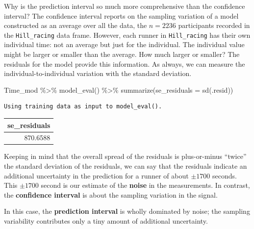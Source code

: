 \documentclass[
  letterpaper,
  DIV=11,
  numbers=noendperiod,
  oneside]{scrreprt}
\newenvironment{Shaded}{\begin{snugshade}}{\end{snugshade}}
\newcommand{\AttributeTok}[1]{\textcolor[rgb]{0.40,0.45,0.13}{#1}}
\newcommand{\FunctionTok}[1]{\textcolor[rgb]{0.28,0.35,0.67}{#1}}
\newcommand{\NormalTok}[1]{\textcolor[rgb]{0.00,0.23,0.31}{#1}}
\newcommand{\SpecialCharTok}[1]{\textcolor[rgb]{0.37,0.37,0.37}{#1}}
\begin{document}
Why is the prediction interval so much more comprehensive than the
confidence interval? The confidence interval reports on the sampling
variation of a model constructed as an average over all the data, the
\(n=2236\) participants recorded in the \texttt{Hill\_racing} data
frame. However, each runner in \texttt{Hill\_racing} has their own
individual time: not an average but just for the individual. The
individual value might be larger or smaller than the average. How much
larger or smaller? The residuals for the model provide this information.
As always, we can measure the individual-to-individual variation with
the standard deviation.

\begin{Shaded}
\begin{Highlighting}[]
\NormalTok{Time\_mod }\SpecialCharTok{\%\textgreater{}\%} \FunctionTok{model\_eval}\NormalTok{() }\SpecialCharTok{\%\textgreater{}\%} \FunctionTok{summarize}\NormalTok{(}\AttributeTok{se\_residuals =} \FunctionTok{sd}\NormalTok{(.resid))}
\end{Highlighting}
\end{Shaded}

\begin{verbatim}
Using training data as input to model_eval().
\end{verbatim}

\ttfamily 
\begin{tabular}{r}
\toprule
se\_residuals\\
\midrule
870.6588\\
\bottomrule
\end{tabular} \normalfont
\bigskip

Keeping in mind that the overall spread of the residuals is
plus-or-minus ``twice'' the standard deviation of the residuals, we can
say that the residuals indicate an additional uncertainty in the
prediction for a runner of about \(\pm 1700\) seconds. This \(\pm 1700\)
second is our estimate of the \textbf{noise} in the measurements. In
contrast, the \textbf{confidence interval} is about the sampling
variation in the signal.

In this case, the \textbf{prediction interval} is wholly dominated by
noise; the sampling variability contributes only a tiny amount of
additional uncertainty.
\end{document}
